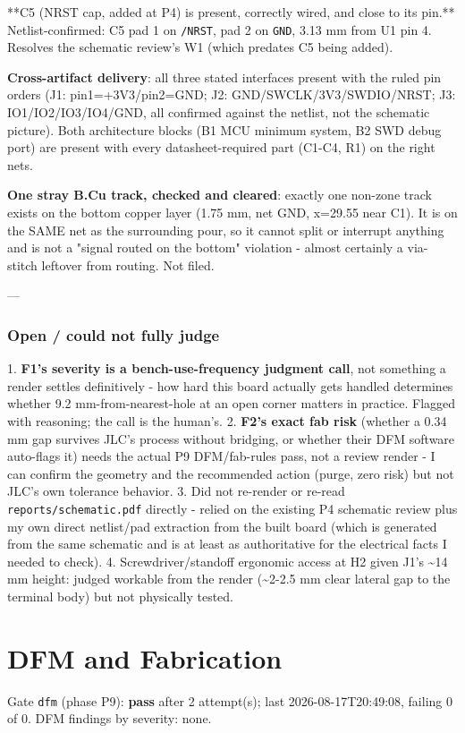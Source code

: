 \documentclass[11pt,a4paper]{article}
\begin{document}
{*}{*}C5 (NRST cap, added at P4) is present, correctly wired, and close to its pin.{*}{*} Netlist-confirmed: C5 pad 1 on \texttt{/NRST}, pad 2 on \texttt{GND}, 3.13 mm from U1 pin 4. Resolves the schematic review's W1 (which predates C5 being added).

\textbf{Cross-artifact delivery}: all three stated interfaces present with the ruled pin orders (J1: pin1=+3V3/pin2=GND; J2: GND/SWCLK/3V3/SWDIO/NRST; J3: IO1/IO2/IO3/IO4/GND, all confirmed against the netlist, not the schematic picture). Both architecture blocks (B1 MCU minimum system, B2 SWD debug port) are present with every datasheet-required part (C1-C4, R1) on the right nets.

\textbf{One stray B.Cu track, checked and cleared}: exactly one non-zone track exists on the bottom copper layer (1.75 mm, net GND, x=29.55 near C1). It is on the SAME net as the surrounding pour, so it cannot split or interrupt anything and is not a "signal routed on the bottom" violation - almost certainly a via-stitch leftover from routing. Not filed.

---

\subsubsection*{Open / could not fully judge}
1. \textbf{F1's severity is a bench-use-frequency judgment call}, not something a render settles definitively - how hard this board actually gets handled determines whether 9.2 mm-from-nearest-hole at an open corner matters in practice. Flagged with reasoning; the call is the human's. 2. \textbf{F2's exact fab risk} (whether a 0.34 mm gap survives JLC's process without bridging, or whether their DFM software auto-flags it) needs the actual P9 DFM/fab-rules pass, not a review render - I can confirm the geometry and the recommended action (purge, zero risk) but not JLC's own tolerance behavior. 3. Did not re-render or re-read \texttt{reports/schematic.pdf} directly - relied on the existing P4 schematic review plus my own direct netlist/pad extraction from the built board (which is generated from the same schematic and is at least as authoritative for the electrical facts I needed to check). 4. Screwdriver/standoff ergonomic access at H2 given J1's \textasciitilde{}14 mm height: judged workable from the render (\textasciitilde{}2-2.5 mm clear lateral gap to the terminal body) but not physically tested.

\section{DFM and Fabrication}
Gate \texttt{dfm} (phase P9): \textbf{pass} after 2 attempt(s); last 2026-08-17T20:49:08, failing 0 of 0.
DFM findings by severity: none.
\end{document}
